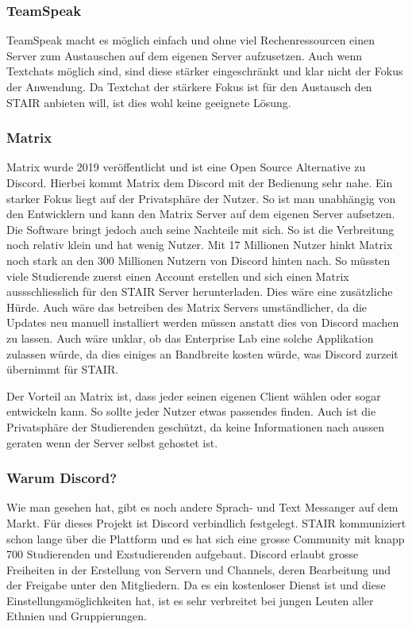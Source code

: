 \documentclass[a4paper, table]{article}
\begin{document}
\subsubsection*{TeamSpeak}

TeamSpeak macht es möglich einfach und ohne viel Rechenressourcen einen Server zum Austauschen auf dem eigenen Server aufzusetzen.
Auch wenn Textchats möglich sind, sind diese stärker eingeschränkt und klar nicht der Fokus der Anwendung.
Da Textchat der stärkere Fokus ist für den Austausch den STAIR anbieten will,
ist dies wohl keine geeignete Lösung.

\subsubsection*{Matrix}

Matrix wurde 2019 veröffentlicht und ist eine Open Source Alternative zu Discord.
Hierbei kommt Matrix dem Discord mit der Bedienung sehr nahe.
Ein starker Fokus liegt auf der Privatsphäre der Nutzer.
So ist man unabhängig von den Entwicklern und kann den Matrix Server auf dem eigenen Server aufsetzen.
Die Software bringt jedoch auch seine Nachteile mit sich.
So ist die Verbreitung noch relativ klein und hat wenig Nutzer.
Mit 17 Millionen Nutzer  hinkt Matrix noch stark an den 300 Millionen Nutzern von Discord hinten nach. 
So müssten viele Studierende zuerst einen Account erstellen und sich einen Matrix aussschliesslich für den STAIR Server herunterladen. Dies wäre eine zusätzliche Hürde.
Auch wäre das betreiben des Matrix Servers umständlicher, da die Updates neu manuell installiert werden müssen anstatt dies von Discord machen zu lassen.
Auch wäre unklar, ob das Enterprise Lab eine solche Applikation zulassen würde, da dies einiges an Bandbreite kosten würde, was Discord zurzeit übernimmt für STAIR.

Der Vorteil an Matrix ist, dass jeder seinen eigenen Client wählen oder sogar entwickeln kann. 
So sollte jeder Nutzer etwas passendes finden.
Auch ist die Privatsphäre der Studierenden geschützt, da keine Informationen nach aussen geraten wenn der Server selbst gehostet ist.

\subsubsection*{Warum Discord?}
Wie man gesehen hat, gibt es noch andere Sprach- und Text Messanger auf dem Markt.
Für dieses Projekt ist Discord verbindlich festgelegt.
STAIR kommuniziert schon lange über die Plattform und es hat sich eine grosse Community mit knapp 700 Studierenden und Exstudierenden aufgebaut.
Discord erlaubt grosse Freiheiten in der Erstellung von Servern und Channels, deren Bearbeitung und der Freigabe unter den Mitgliedern.
Da es ein kostenloser Dienst ist und diese Einstellungsmöglichkeiten hat, ist es sehr verbreitet bei jungen Leuten aller Ethnien und Gruppierungen.
\end{document}
